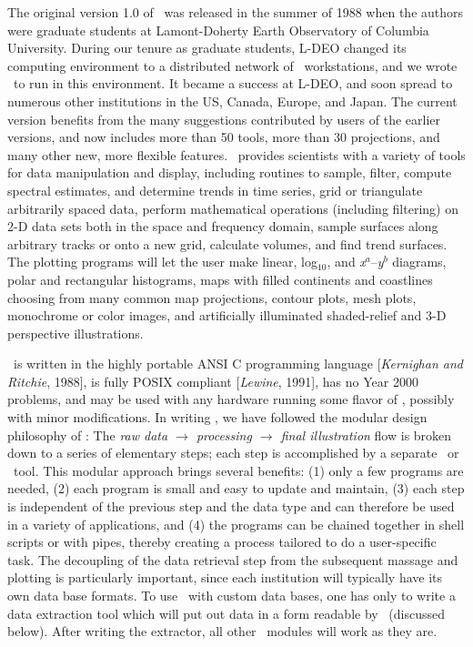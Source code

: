 The original version 1.0 of \GMT\ was released in the summer of 1988
when the authors were graduate students at Lamont-Doherty Earth
Observatory of Columbia University.
During our tenure as graduate
students, L-DEO changed its computing environment to a distributed
network of \UNIX\ workstations, and we wrote \GMT\ to run in this
environment.  It became a success at L-DEO, and soon spread to
numerous other institutions in the US, Canada, Europe, and Japan.
The current version benefits from the many suggestions
contributed by users of the earlier versions, and now includes more
than 50 tools, more than 30 projections, and many other new, more
flexible features.  \GMT\ provides scientists with a variety of
tools for data manipulation and display, including routines to sample,
filter, compute spectral estimates, and determine trends in time
series, grid or triangulate arbitrarily spaced data, perform
mathematical operations (including filtering) on 2-D data sets
both in the space and frequency domain, sample surfaces along
arbitrary tracks or onto a new grid, calculate volumes, and find
trend surfaces.  The plotting programs will let the user make linear,
log$_{10}$, and {\it x$^a$}--{\it y$^b$} diagrams, polar and
rectangular histograms, maps with filled continents and coastlines
choosing from many common map projections, contour plots, mesh plots,
monochrome or color images, and artificially illuminated
shaded-relief and 3-D perspective illustrations. 

\GMT\ is written in the highly portable ANSI C  programming language
[{\it Kernighan and Ritchie}, 1988], is fully POSIX compliant
[{\it Lewine}, 1991], has no Year 2000 problems, and may be used
with any hardware running some flavor of \UNIX, possibly with minor
modifications.  In writing \GMT, we have followed the modular
design philosophy of \UNIX: The {\it raw data $\rightarrow$  processing $\rightarrow$
final illustration} flow is broken down to a series of elementary
steps; each step is accomplished by a separate \GMT\ or \UNIX\ tool.
This modular approach brings several benefits: (1) only a few
programs are needed, (2) each program is small and easy to update
and maintain, (3) each step is independent of the previous step
and the data type and can therefore be used in a variety of
applications, and (4) the programs can be chained together in
shell scripts or with pipes, thereby creating a process tailored
to do a user-specific task.  The  decoupling of the data retrieval
step from the subsequent massage and plotting is particularly
important, since each institution will typically have its own
data base formats.  To use \GMT\ with custom data bases, one has
only to write a data extraction tool which will put out data in a
form readable by \GMT\ (discussed below).  After writing the extractor,
all other \GMT\ modules will work as they are. 

